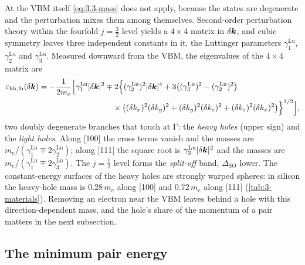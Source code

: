At the VBM itself \cref{eq:3.3-mass} does not apply, because the states are degenerate and the perturbation mixes them among themselves. Second-order perturbation theory within the fourfold $j = \frac32$ level yields a $4\times4$ matrix in $\delta\bm{k}$, and cubic symmetry leaves three independent constants in it, the Luttinger parameters $\gamma^{\mathrm{Lu}}_1$, $\gamma^{\mathrm{Lu}}_2$ and $\gamma^{\mathrm{Lu}}_3$. Measured downward from the VBM, the eigenvalues of the $4\times4$ matrix are~\cite{luttinger1956quantum}\cite[Chap.~2]{yu2010fundamentals}
\begin{equation}
  \begin{split}
  \varepsilon_{\mathrm{hh},\mathrm{lh}}(\delta\bm{k}) = -\frac{1}{2m_e}\Bigl[\gamma^{\mathrm{Lu}}_1|\delta\bm{k}|^2
    &\mp 2\Bigl\{(\gamma^{\mathrm{Lu}}_2)^2|\delta\bm{k}|^4 + 3\bigl((\gamma^{\mathrm{Lu}}_3)^2 - (\gamma^{\mathrm{Lu}}_2)^2\bigr) \\
    &\quad\times\bigl((\delta k_x)^2(\delta k_y)^2 + (\delta k_y)^2(\delta k_z)^2 + (\delta k_z)^2(\delta k_x)^2\bigr)\Bigr\}^{1/2}\Bigr] ,
  \end{split}
  \label{eq:3.3-holes}
\end{equation}
two doubly degenerate branches that touch at $\mathrm{\Gamma}$: the \emph{heavy holes} (upper sign) and the \emph{light holes}. Along [100] the cross terms vanish and the masses are $m_e/(\gamma^{\mathrm{Lu}}_1 \mp 2\gamma^{\mathrm{Lu}}_2)$; along [111] the square root is $\gamma^{\mathrm{Lu}}_3|\delta\bm{k}|^2$ and the masses are $m_e/(\gamma^{\mathrm{Lu}}_1 \mp 2\gamma^{\mathrm{Lu}}_3)$. The $j = \frac12$ level forms the \emph{split-off} band, $\Delta_{\mathrm{SO}}$ lower. The constant-energy surfaces of the heavy holes are strongly warped spheres: in silicon the heavy-hole mass is $0.28\,m_e$ along [100] and $0.72\,m_e$ along [111] (\cref{tab:3-materials}). Removing an electron near the VBM leaves behind a hole with this direction-dependent mass, and the hole's share of the momentum of a pair matters in the next subsection.

\subsection{The minimum pair energy}

